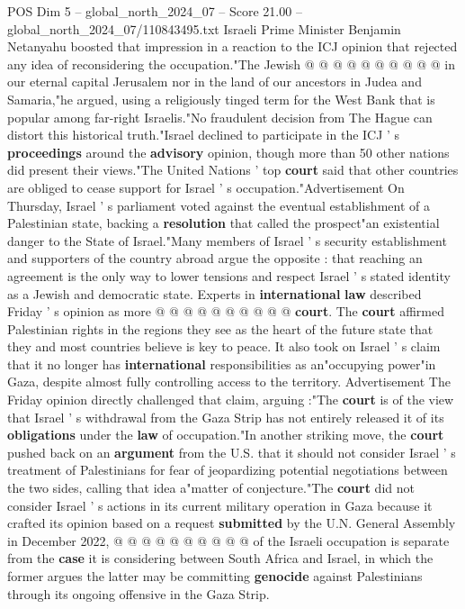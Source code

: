 \begin{textsample}{POS Dim 5 – global\_north\_2024\_07 – Score 21.00 – global\_north\_2024\_07/110843495.txt}
Israeli Prime Minister Benjamin Netanyahu boosted that impression in a reaction to the ICJ opinion that rejected any idea of reconsidering the occupation."The Jewish @ @ @ @ @ @ @ @ @ @ in our eternal capital Jerusalem nor in the land of our ancestors in Judea and Samaria,"he argued, using a religiously tinged term for the West Bank that is popular among far-right Israelis."No fraudulent decision from The Hague can distort this historical truth."Israel declined to participate in the ICJ ' s \textbf{proceedings} around the \textbf{advisory} opinion, though more than 50 other nations did present their views."The United Nations ' top \textbf{court} said that other countries are obliged to cease support for Israel ' s occupation."Advertisement On Thursday, Israel ' s parliament voted against the eventual establishment of a Palestinian state, backing a \textbf{resolution} that called the prospect"an existential danger to the State of Israel."Many members of Israel ' s security establishment and supporters of the country abroad argue the opposite : that reaching an agreement is the only way to lower tensions and respect Israel ' s stated identity as a Jewish and democratic state.
Experts in \textbf{international} \textbf{law} described Friday ' s opinion as more @ @ @ @ @ @ @ @ @ @ \textbf{court}.
The \textbf{court} affirmed Palestinian rights in the regions they see as the heart of the future state that they and most countries believe is key to peace.
It also took on Israel ' s claim that it no longer has \textbf{international} responsibilities as an"occupying power"in Gaza, despite almost fully controlling access to the territory.
Advertisement The Friday opinion directly challenged that claim, arguing :"The \textbf{court} is of the view that Israel ' s withdrawal from the Gaza Strip has not entirely released it of its \textbf{obligations} under the \textbf{law} of occupation."In another striking move, the \textbf{court} pushed back on an \textbf{argument} from the U.S. that it should not consider Israel ' s treatment of Palestinians for fear of jeopardizing potential negotiations between the two sides, calling that idea a"matter of conjecture."The \textbf{court} did not consider Israel ' s actions in its current military operation in Gaza because it crafted its opinion based on a request \textbf{submitted} by the U.N.
General Assembly in December 2022, @ @ @ @ @ @ @ @ @ @ of the Israeli occupation is separate from the \textbf{case} it is considering between South Africa and Israel, in which the former argues the latter may be committing \textbf{genocide} against Palestinians through its ongoing offensive in the Gaza Strip.

\end{textsample}
